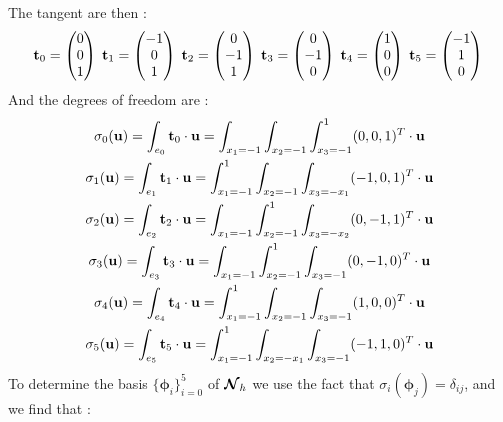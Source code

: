 The tangent are then :
\[ {\mathbf{t}}_0=\begin{pmatrix}0\\0\\1\end{pmatrix}\;
{\mathbf{t}}_1=\begin{pmatrix}-1\\0\\1\end{pmatrix}\;
{\mathbf{t}}_2=\begin{pmatrix}0\\-1\\1\end{pmatrix}\;
{\mathbf{t}}_3=\begin{pmatrix}0\\-1\\0\end{pmatrix}\;
{\mathbf{t}}_4=\begin{pmatrix}1\\0\\0\end{pmatrix}\;
{\mathbf{t}}_5=\begin{pmatrix}-1\\1\\0\end{pmatrix}\;
\]
And the degrees of freedom are :
\begin{gather*}
\sigma_0({\mathbf{u}}) = \int_{e_0} {\mathbf{t}}_0\cdot{\mathbf{u}} =
\int_{x_1=-1}\int_{x_2=-1}\int_{x_3=-1}^1 (0,0,1)^T\cdot{\mathbf{u}}\\
\sigma_1({\mathbf{u}}) = \int_{e_1} {\mathbf{t}}_1\cdot{\mathbf{u}} =
\int_{x_1=-1}^1\int_{x_2=-1}\int_{x_3=-x_1} (-1,0,1)^T\cdot{\mathbf{u}}\\
\sigma_2({\mathbf{u}}) = \int_{e_2} {\mathbf{t}}_2\cdot{\mathbf{u}} =
\int_{x_1=-1}\int_{x_2=-1}^1\int_{x_3=-x_2} (0,-1,1)^T\cdot{\mathbf{u}}\\
\sigma_3({\mathbf{u}}) = \int_{e_3} {\mathbf{t}}_3\cdot{\mathbf{u}} =
\int_{x_1=-1}\int_{x_2=-1}^1\int_{x_3=-1} (0,-1,0)^T\cdot{\mathbf{u}}\\
\sigma_4({\mathbf{u}}) = \int_{e_4} {\mathbf{t}}_4\cdot{\mathbf{u}} =
\int_{x_1=-1}^1\int_{x_2=-1}\int_{x_3=-1} (1,0,0)^T\cdot{\mathbf{u}}\\
\sigma_5({\mathbf{u}}) = \int_{e_5} {\mathbf{t}}_5\cdot{\mathbf{u}} =
\int_{x_1=-1}^1\int_{x_2=-x_1}\int_{x_3=-1} (-1,1,0)^T\cdot{\mathbf{u}}
\end{gather*}
To determine the basis $\{\bm{\phi}_i\}_{i=0}^5$ of ${\bm{\mathcal{N}}}_h$ we use the fact that
$\sigma_i(\bm{\phi}_j) = \delta_{ij}$, and we find that :
